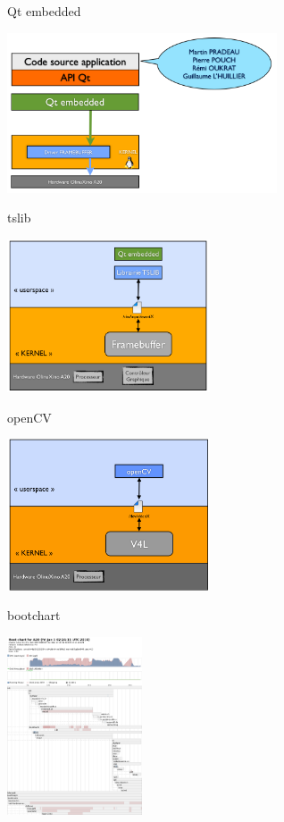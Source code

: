 \documentclass[11pt]{beamer}
\begin{document}
	\begin{frame}[label=Qt]{Qt embedded}
	\begin{center}
			  \includegraphics[width=8cm]{common/Qt_arch.png}
		\end{center}
		\hyperlink{pageQt}{}
	\end{frame}
	
	\begin{frame}[label=tslib]{tslib}
	\begin{center}
			  \includegraphics[width=6cm]{common/tslib.png}
		\end{center}
		\hyperlink{pageQt}{}
	\end{frame}
	
	\begin{frame}[label=openCV]{openCV}
			\begin{center}
			  \includegraphics[width=6cm]{common/v4l.png}
		\end{center}
		\hyperlink{pageopenCV}{}
	\end{frame}
	
	\begin{frame}[label=bootchart]{bootchart}
			\begin{center}
			  \includegraphics[width=4cm]{common/bootchart.png}
		\end{center}
		\hyperlink{optimisation}{}
	\end{frame}
\end{document}
